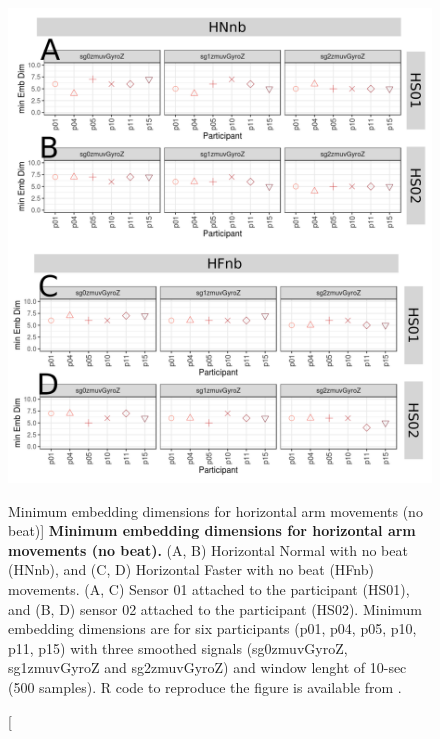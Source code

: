 \begin{figure}
\centering
\includegraphics[width=1.0\textwidth]{cao_Hnb_w10}
	\caption
	[Minimum embedding dimensions for horizontal arm movements 
	(no beat)]{
	{\bf Minimum embedding dimensions for horizontal arm movements 
	(no beat).} 
		(A, B) Horizontal Normal with no beat (HNnb), and 
		(C, D) Horizontal Faster with no beat (HFnb) movements.
		(A, C) Sensor 01 attached to the participant (HS01), and
		(B, D) sensor 02 attached to the participant (HS02).
		Minimum embedding dimensions are for six participants 
		(p01, p04, p05, p10, p11, p15) with three smoothed signals 
		(sg0zmuvGyroZ, sg1zmuvGyroZ and sg2zmuvGyroZ)
		and window lenght of 10-sec (500 samples).
		R code to reproduce the figure is available 
		from \cite{hwum2018}.
        }
    \label{fig:caoHnb}
\end{figure}

